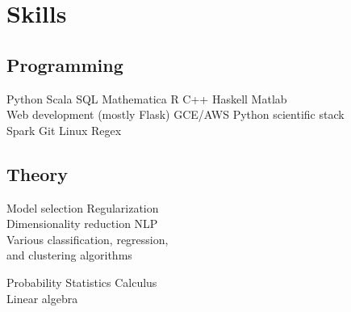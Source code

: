 \documentclass[]{deedy-resume-openfont}
\begin{document}
\begin{minipage}[t]{0.33\textwidth}


 \section{Skills}
 \subsection{Programming}
 Python \textbullet{} Scala \textbullet{} SQL \textbullet{} Mathematica
 R \textbullet{} C++ \textbullet{} Haskell \textbullet{} Matlab \\
 Web development (mostly Flask)
GCE/AWS \textbullet{} Python scientific stack \\
Spark \textbullet{} Git \textbullet{} Linux \textbullet{} Regex
\sectionsep

\subsection{Theory}
Model selection \textbullet{} Regularization \\
Dimensionality reduction \textbullet{} NLP  \\
Various classification, regression, \\
and clustering algorithms

Probability \textbullet{} Statistics \textbullet{} Calculus \\
Linear algebra



%
%

\end{minipage} 
\end{document}
